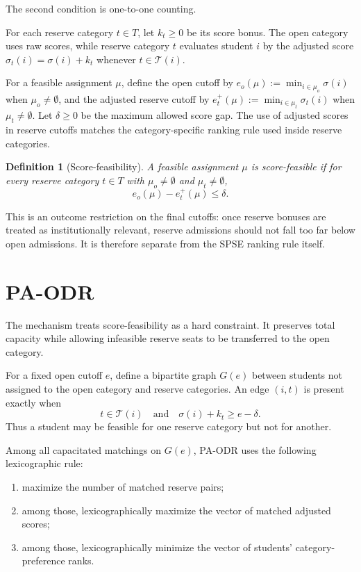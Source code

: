 \documentclass[10pt]{article}
\newtheorem{definition}{Definition}
\newcommand{\T}{\mathcal{T}}
\begin{document}
The second condition is one-to-one counting.

For each reserve category $t\in T$, let $k_t\ge 0$ be its score bonus. The open category uses raw scores, while reserve category $t$ evaluates student $i$ by the adjusted score $\sigma_t(i)=\sigma(i)+k_t$ whenever $t\in\T(i)$.

For a feasible assignment $\mu$, define the open cutoff by $e_o(\mu):=\min_{i\in\mu_o}\sigma(i)$ when $\mu_o\neq\emptyset$, and the adjusted reserve cutoff by $e_t^+(\mu):=\min_{i\in\mu_t}\sigma_t(i)$ when $\mu_t\neq\emptyset$. Let $\delta\ge 0$ be the maximum allowed score gap. The use of adjusted scores in reserve cutoffs matches the category-specific ranking rule used inside reserve categories.

\begin{definition}[Score-feasibility]
\label{def:paodr-score-feasibility}
A feasible assignment $\mu$ is score-feasible if for every reserve category $t\in T$ with $\mu_o\neq\emptyset$ and $\mu_t\neq\emptyset$,
\[
e_o(\mu)-e_t^+(\mu)\le \delta.
\]
\end{definition}

This is an outcome restriction on the final cutoffs: once reserve bonuses are treated as institutionally relevant, reserve admissions should not fall too far below open admissions. It is therefore separate from the SPSE ranking rule itself.

\section{PA-ODR}

The mechanism treats score-feasibility as a hard constraint. It preserves total capacity while allowing infeasible reserve seats to be transferred to the open category.

For a fixed open cutoff $e$, define a bipartite graph $G(e)$ between students not assigned to the open category and reserve categories. An edge $(i,t)$ is present exactly when
\[
t\in\T(i)\quad\text{and}\quad \sigma(i)+k_t\ge e-\delta.
\]
Thus a student may be feasible for one reserve category but not for another.

Among all capacitated matchings on $G(e)$, PA-ODR uses the following lexicographic rule:
\begin{enumerate}
\item maximize the number of matched reserve pairs;
\item among those, lexicographically maximize the vector of matched adjusted scores;
\item among those, lexicographically minimize the vector of students' category-preference ranks.
\end{enumerate}
\end{document}
